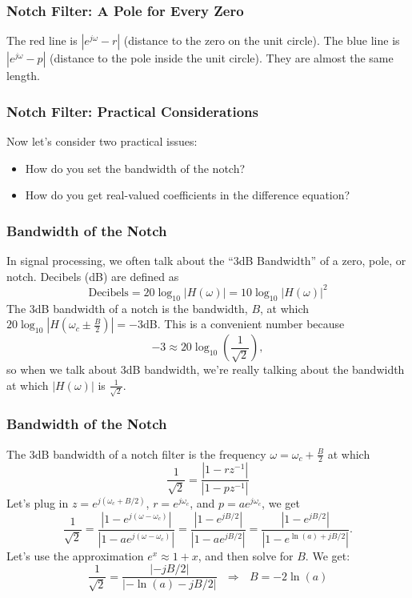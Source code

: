 \documentclass{beamer}
\begin{document}
\begin{frame}
  \frametitle{Notch Filter: A Pole for Every Zero} The red line is
  $|e^{j\omega}-r|$ (distance to the zero on the unit circle).  The
  blue line is $|e^{j\omega}-p|$ (distance to the pole inside the unit
  circle).  They are almost the same length.
  \centerline{}
\end{frame}

\begin{frame}
  \frametitle{Notch Filter: Practical Considerations}

  Now let's consider two practical issues:
  \begin{itemize}
  \item How do you set the bandwidth of the notch?
  \item How do you get real-valued coefficients in the difference equation?
  \end{itemize}
\end{frame}

\begin{frame}
  \frametitle{Bandwidth of the Notch}

  In signal processing, we often talk about the ``3dB Bandwidth'' of a
  zero, pole, or notch.  Decibels (dB)  are defined as
  \begin{displaymath}
    \mbox{Decibels} = 20\log_{10}|H(\omega)| = 10\log_{10}|H(\omega)|^2
  \end{displaymath}
  The 3dB bandwidth of a notch is the bandwidth, $B$, at which
  $20\log_{10}|H\left(\omega_c\pm \frac{B}{2}\right)|=-3$dB.  This is a convenient number because
  \begin{displaymath}
    -3 \approx 20\log_{10}\left(\frac{1}{\sqrt{2}}\right),
  \end{displaymath}
  so when we talk about 3dB bandwidth, we're really talking about the
  bandwidth at which $|H(\omega)|$ is $\frac{1}{\sqrt{2}}$.
\end{frame}

\begin{frame}
  \frametitle{Bandwidth of the Notch}

  The 3dB bandwidth of a notch filter is the frequency
  $\omega=\omega_c+\frac{B}{2}$ at which
  \begin{displaymath}
    \frac{1}{\sqrt{2}} = \frac{|1-rz^{-1}|}{|1-pz^{-1}|}
  \end{displaymath}
  Let's plug in $z=e^{j(\omega_c+B/2)}$, $r=e^{j\omega_c}$, and $p=ae^{j\omega_c}$, we get
  \begin{displaymath}
    \frac{1}{\sqrt{2}} = \frac{|1-e^{j(\omega-\omega_c)}|}{|1-ae^{j(\omega-\omega_c)}|}
    = \frac{|1-e^{jB/2}|}{|1-ae^{jB/2}|}
    = \frac{|1-e^{jB/2}|}{|1-e^{\ln(a)+jB/2}|}.
  \end{displaymath}
  Let's use the approximation $e^x\approx 1+x$, and then 
  solve for $B$.  We get:
  \begin{displaymath}
    \frac{1}{\sqrt{2}}=\frac{|-jB/2|}{|-\ln(a)-jB/2|}
    ~~~\Rightarrow~~~B = - 2\ln(a)
  \end{displaymath}
\end{frame}
\end{document}
